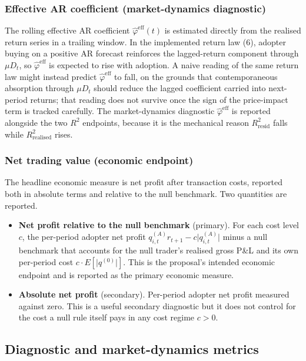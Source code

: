 \documentclass[11pt]{article}
\begin{document}
\subsubsection{Effective AR coefficient (market-dynamics diagnostic)}

The rolling effective AR coefficient $\hat{\varphi}^{\mathrm{eff}}(t)$ is estimated directly from the realised return series in a trailing window. In the implemented return law (6), adopter buying on a positive AR forecast reinforces the lagged-return component through $\mu D_t$, so $\hat{\varphi}^{\mathrm{eff}}$ is expected to rise with adoption. A naive reading of the same return law might instead predict $\hat{\varphi}^{\mathrm{eff}}$ to fall, on the grounds that contemporaneous absorption through $\mu D_t$ should reduce the lagged coefficient carried into next-period returns; that reading does not survive once the sign of the price-impact term is tracked carefully. The market-dynamics diagnostic $\hat{\varphi}^{\mathrm{eff}}$ is reported alongside the two $R^{2}$ endpoints, because it is the mechanical reason $R^{2}_{\mathrm{resid}}$ falls while $R^{2}_{\mathrm{realised}}$ rises.

\subsubsection{Net trading value (economic endpoint)}

The headline economic measure is net profit after transaction costs, reported both in absolute terms and relative to the null benchmark. Two quantities are reported.

\begin{itemize}[itemsep=0.2em]
  \item \textbf{Net profit relative to the null benchmark} (primary). For each cost level $c$, the per-period adopter net profit $q_{i,t}^{(A)} r_{t+1} - c \lvert q_{i,t}^{(A)} \rvert$ minus a null benchmark that accounts for the null trader's realised gross P\&L and its own per-period cost $c \cdot E[\lvert q^{(0)} \rvert]$. This is the proposal's intended economic endpoint and is reported as the primary economic measure.
  \item \textbf{Absolute net profit} (secondary). Per-period adopter net profit measured against zero. This is a useful secondary diagnostic but it does not control for the cost a null rule itself pays in any cost regime $c > 0$.
\end{itemize}

\subsection{Diagnostic and market-dynamics metrics}
\end{document}
